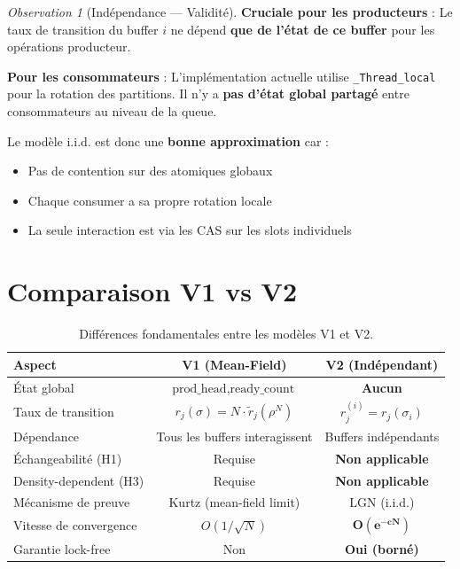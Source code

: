 \documentclass[11pt,a4paper]{article}
\theoremstyle{plain}
\theoremstyle{definition}
\theoremstyle{remark}
\newtheorem{observation}[theorem]{Observation}
\begin{document}
\begin{observation}[Indépendance --- Validité]
\textbf{Cruciale pour les producteurs} : Le taux de transition du buffer $i$ ne dépend \textbf{que de l'état de ce buffer} pour les opérations producteur.

\textbf{Pour les consommateurs} : L'implémentation actuelle utilise \texttt{\_Thread\_local} pour la rotation des partitions. Il n'y a \textbf{pas d'état global partagé} entre consommateurs au niveau de la queue.

Le modèle i.i.d. est donc une \textbf{bonne approximation} car :
\begin{itemize}
    \item Pas de contention sur des atomiques globaux
    \item Chaque consumer a sa propre rotation locale
    \item La seule interaction est via les CAS sur les slots individuels
\end{itemize}
\end{observation}

\section{Comparaison V1 vs V2}

\begin{table}[htbp]
\centering
\caption{Différences fondamentales entre les modèles V1 et V2.}
\label{tab:v1_v2_comparison}
\small
\begin{tabular}{lcc}
\toprule
\textbf{Aspect} & \textbf{V1 (Mean-Field)} & \textbf{V2 (Indépendant)} \\
\midrule
État global & $\text{prod\_head}, \text{ready\_count}$ & \textbf{Aucun} \\
Taux de transition & $r_j(\sigma) = N \cdot \tilde{r}_j(\rho^N)$ & $r_j^{(i)} = r_j(\sigma_i)$ \\
Dépendance & Tous les buffers interagissent & Buffers indépendants \\
Échangeabilité (H1) & Requise & \textbf{Non applicable} \\
Density-dependent (H3) & Requise & \textbf{Non applicable} \\
Mécanisme de preuve & Kurtz (mean-field limit) & LGN (i.i.d.) \\
Vitesse de convergence & $O(1/\sqrt{N})$ & $\mathbf{O(e^{-cN})}$ \\
Garantie lock-free & Non & \textbf{Oui (borné)} \\
\bottomrule
\end{tabular}
\end{table}
\end{document}
